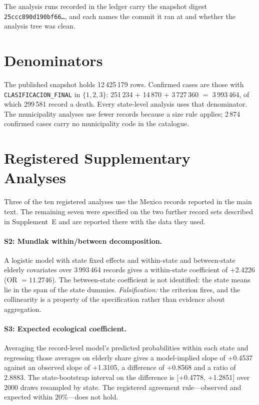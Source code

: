 \documentclass[11pt]{article}
\begin{document}
\begin{sloppypar}
The analysis runs recorded in the ledger carry the snapshot digest
\texttt{25ccc890d190bf66\ldots}, and each names the
commit it ran at and whether the analysis tree was clean.
\end{sloppypar}

\section{Denominators}
\label{supp:denominators}

The published snapshot holds 12\,425\,179 rows.  Confirmed cases are
those with \texttt{CLASIFICACION\_FINAL} in $\{1, 2, 3\}$:
251\,234 $+$ 14\,870 $+$
3\,727\,360 $=$ 3\,993\,464, of which
299\,581 record a death.  Every state-level analysis uses that
denominator.  The municipality analyses use fewer records because a size rule
applies; 2\,874
confirmed cases carry no municipality code in the catalogue.

\section{Registered Supplementary Analyses}
\label{supp:preregistered}

Three of the ten registered analyses use the Mexico records reported in the
main text.  The remaining seven were specified on the two further record sets
described in Supplement~E and are reported there with the data they used.

\paragraph{S2: Mundlak within/between decomposition.}
A logistic model with state fixed effects and within-state and between-state
elderly covariates over 3\,993\,464
records gives a within-state coefficient of
+2.4226
(OR $= 11.2746$).  The
between-state coefficient is not identified: the state means lie in the span of
the state dummies.  \emph{Falsification:} the criterion fires, and the
collinearity is a property of the specification rather than evidence about
aggregation.

\paragraph{S3: Expected ecological coefficient.}
Averaging the record-level model's predicted probabilities within each state
and regressing those averages on elderly share gives a model-implied slope of
+0.4537 against an observed slope of
+1.3105, a difference of
+0.8568 and a ratio of
2.8883.  The state-bootstrap interval on the
difference is [+0.4778,
+1.2851] over
2000 draws resampled by state.  The registered agreement
rule---observed and expected within 20\%---does not hold.
\end{document}
